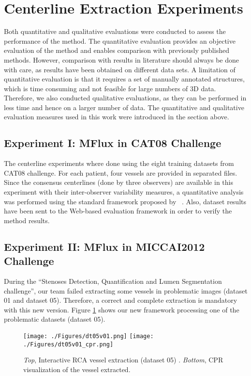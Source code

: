 \section{Centerline Extraction Experiments}

Both quantitative and qualitative evaluations were conducted to assess the performance of the method. The quantitative evaluation provides an objective evaluation of the method and enables comparison with previously published methods. However, comparison with results in literature should always be done with care, as results have been obtained on different data sets. A limitation of quantitative evaluation is that it requires a set of manually annotated structures, which is time consuming and not feasible for large numbers of 3D data. Therefore, we also conducted qualitative evaluations, as they can be performed in less time and hence on a larger number of data. The quantitative and qualitative evaluation measures used in this work were introduced in the section above.

\subsection{Experiment I: MFlux in CAT08 Challenge}

The centerline experiments where done using the eight training datasets from CAT08 challenge. For each patient, four vessels are provided in separated files. Since the consensus centerlines (done by three observers) are available in this experiment with their inter-observer variability measures, a quantitative analysis was performed using the standard framework proposed by ~\citep{Schaap2009}. Also, dataset results have been sent to the Web-based evaluation framework in order to verify the method results.

\subsection{Experiment II: MFlux in MICCAI2012 Challenge}

During the ``Stenoses Detection, Quantification and Lumen Segmentation challenge'', our team failed extracting some  vessels in problematic images (dataset 01 and dataset 05). Therefore, a correct and complete extraction is mandatory with this new version. Figure \ref{fig:exp2_dt05} shows our new framework processing one of the problematic datasets (dataset 05).

\begin{figure}[htbp]
	\centering
		\texttt{[image: ./Figures/dt05v01.png]}
		\texttt{[image: ./Figures/dt05v01\_cpr.png]}
	\caption[MICCAI2012 Extraction]{\textit{Top}, Interactive RCA vessel extraction (dataset 05) . \textit{Bottom}, CPR visualization of the vessel extracted.}
	\label{fig:exp2_dt05}
\end{figure}

